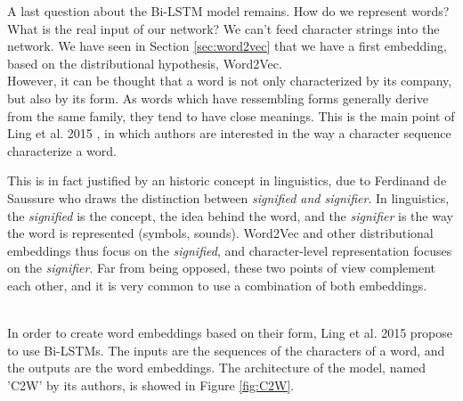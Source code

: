 \documentclass{article}
\begin{document}
A last question about the Bi-LSTM model remains. How do we represent words?  What is the real 
input of our network? We can't feed character strings into the network. We have seen in 
Section \ref{sec:word2vec} that we have a first embedding, based on the distributional 
hypothesis, Word2Vec.\\ However, it can be thought that a word is not only characterized
by its company, but also by its form. As words which have ressembling forms
 generally derive from the same family, they tend to have close meanings. 
This is the main point of Ling et al. 2015 
\cite{Ling2015FindingRepresentation}, in which authors are interested in the way 
a character sequence characterize a word.  \\ \par 
This is in fact justified by an historic concept 
in linguistics, due to Ferdinand de Saussure who draws the distinction between 
\textit{signified and signifier}. In linguistics, the \textit{signified} is the concept, the idea
behind the word, and the \textit{signifier} is the way the word is represented (symbols, sounds).
Word2Vec and other distributional embeddings thus focus on the \textit{signified}, 
and character-level representation focuses on the \textit{signifier}. Far from 
being opposed, these two points of view complement each other, and it is very common 
to use a combination of both embeddings. \\ \par 
 
In order to create word embeddings based on their form, Ling et al. 2015 \cite{Ling2015FindingRepresentation}
propose to use Bi-LSTMs. The inputs are the sequences of the characters of a word, and the outputs are the 
word embeddings. The architecture of the model, named 'C2W' by its authors, is showed in Figure \ref{fig:C2W}.
\end{document}
